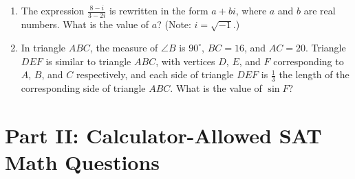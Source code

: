 \begin{enumerate}[leftmargin=*, label=\textbf{\arabic*.}]
  \newpage
  \item The expression $\displaystyle \frac{8 - i}{3 - 2i}$ is rewritten in the form $a + bi$, where $a$ and $b$ are real numbers. What is the value of $a$? (Note: $i = \sqrt{-1}$.)
  \vspace{4cm}

  \item In triangle $ABC$, the measure of $\angle B$ is $90^\circ$, $BC = 16$, and $AC = 20$. Triangle $DEF$ is similar to triangle $ABC$, with vertices $D$, $E$, and $F$ corresponding to $A$, $B$, and $C$ respectively, and each side of triangle $DEF$ is $\frac{1}{3}$ the length of the corresponding side of triangle $ABC$. What is the value of $\sin F$?
  \vspace{4cm}

\end{enumerate}


\newpage

\section*{Part II: Calculator-Allowed SAT Math Questions}

